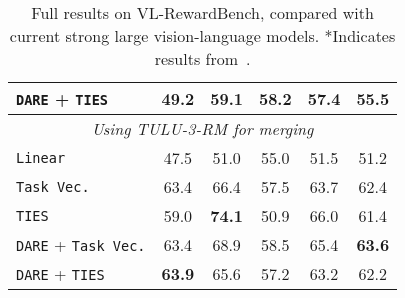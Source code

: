 \begin{table*}[hbtp]
{\begin{tabular}{l | c c c | c c}
            \texttt{DARE} + \texttt{TIES}      & 49.2 & 59.1 & 58.2 & 57.4 & 55.5 \\
            \midrule
            \multicolumn{6}{c}{\textit{Using TULU-3-RM for merging}} \\
            \midrule
            \texttt{Linear}                    & 47.5 & 51.0 & 55.0 & 51.5 & 51.2 \\
            \texttt{Task Vec.}                 & 63.4 & 66.4 & 57.5 & 63.7 & 62.4 \\
            \texttt{TIES}                      & 59.0 & \textbf{74.1} & 50.9 & 66.0 & 61.4 \\
            \texttt{DARE} + \texttt{Task Vec.} & 63.4 & 68.9 & 58.5 & 65.4 & \textbf{63.6} \\
            \texttt{DARE} + \texttt{TIES}      & \textbf{63.9} & 65.6 & 57.2 & 63.2 & 62.2 \\
            \bottomrule
        \end{tabular}
    }
    \caption{Full results on VL-RewardBench, compared with current strong large vision-language models. *Indicates results from~\citet{li2024vlrewardbench}.}
    \label{tab:vlrb_full}
\end{table*}